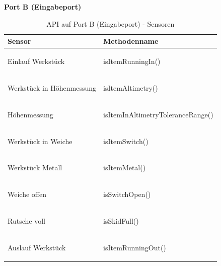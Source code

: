 \documentclass[a4paper, 11pt]{article}
\begin{document}
\newpage

\noindent\textbf{Port B (Eingabeport)}
\begin{table}[H]
\center
    \begin{tabularx}{\textwidth}{|X|X|}
    \hline
    \textbf{Sensor}&\textbf{Methodenname}\\
    \hline
    Einlauf Werkstück&\begin{compactenum}[]
        \item \ttfamily isItemRunningIn()
    \end{compactenum}\\
    \hline
    Werkstück in Höhenmessung&\begin{compactenum}[]
        \item \ttfamily isItemAltimetry()
    \end{compactenum}\\
    \hline
    Höhenmessung&\begin{compactenum}[]
        \item \ttfamily isItemInAltimetryToleranceRange()
    \end{compactenum}\\
    \hline
    Werkstück in Weiche&\begin{compactenum}[]
        \item \ttfamily isItemSwitch()
    \end{compactenum}\\
    \hline
    Werkstück Metall&\begin{compactenum}[]
        \item \ttfamily isItemMetal()
    \end{compactenum}\\
    \hline
    Weiche offen&\begin{compactenum}[]
        \item \ttfamily isSwitchOpen()
    \end{compactenum}\\
    \hline
    Rutsche voll&\begin{compactenum}[]
        \item \ttfamily isSkidFull()
    \end{compactenum}\\
    \hline
    Auslauf Werkstück&\begin{compactenum}[]
        \item \ttfamily isItemRunningOut()
    \end{compactenum}\\
    \hline
    \end{tabularx}
    \caption{API auf Port B (Eingabeport) - Sensoren}
    \label{portB}
\end{table}
\end{document}

